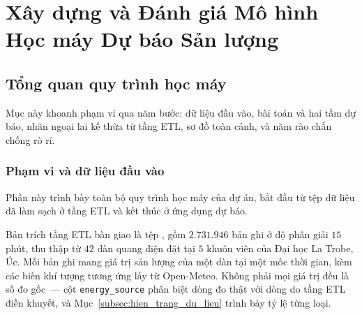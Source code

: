 \documentclass[12pt, a4paper]{report}
\begin{document}
\newpage
\setcounter{topnumber}{3}
\setcounter{bottomnumber}{2}
\setcounter{totalnumber}{4}
\renewcommand{\topfraction}{0.92}
\renewcommand{\bottomfraction}{0.7}
\renewcommand{\textfraction}{0.06}
\renewcommand{\floatpagefraction}{0.85}

\chapter{Xây dựng và Đánh giá Mô hình Học máy Dự báo Sản lượng}
\label{chap:forecasting}

%

\FloatBarrier
\section{Tổng quan quy trình học máy}

Mục này khoanh phạm vi qua năm bước: dữ liệu đầu vào, bài toán và hai tầm dự báo, nhãn
ngoại lai kế thừa từ tầng ETL, sơ đồ toàn cảnh, và năm rào chắn chống rò rỉ.

\FloatBarrier
\subsection{Phạm vi và dữ liệu đầu vào}

Phần này trình bày toàn bộ quy trình học máy của dự án, bắt đầu từ tệp dữ liệu đã
làm sạch ở tầng ETL và kết thúc ở ứng dụng dự báo.

Bản trích tầng ETL bàn giao là tệp ,
gồm $2.731.946$ bản ghi ở độ phân giải $15$ phút, thu thập từ $42$ dàn quang điện
đặt tại $5$ khuôn viên của Đại học La Trobe, Úc. Mỗi bản ghi mang giá trị sản lượng
của một dàn tại một mốc thời gian, kèm các biến khí tượng tương ứng lấy từ Open-Meteo.
Không phải mọi giá trị đều là số đo gốc~--- cột \texttt{energy\_source} phân biệt dòng
đo thật với dòng do tầng ETL điền khuyết, và Mục~\ref{subsec:hien_trang_du_lieu} trình bày tỷ lệ từng loại.
\end{document}
